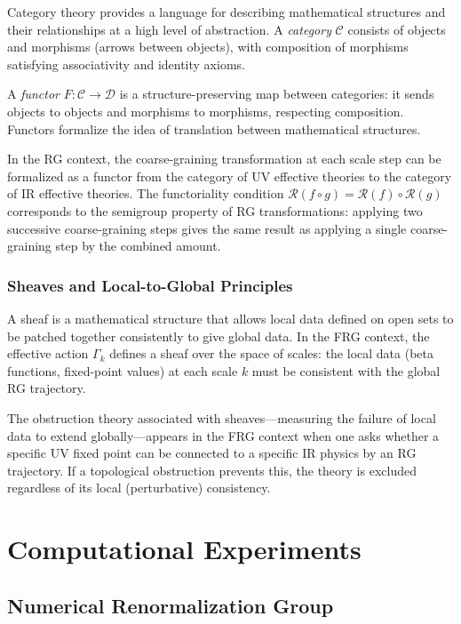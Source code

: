 \documentclass[12pt,a4paper,oneside]{book}
\theoremstyle{definition}
\theoremstyle{plain}
\theoremstyle{remark}
\begin{document}
Category theory provides a language for describing mathematical structures
and their relationships at a high level of abstraction. A \emph{category}
$\mathcal{C}$ consists of objects and morphisms (arrows between objects),
with composition of morphisms satisfying associativity and identity axioms.

A \emph{functor} $F: \mathcal{C} \to \mathcal{D}$ is a structure-preserving
map between categories: it sends objects to objects and morphisms to morphisms,
respecting composition. Functors formalize the idea of translation between
mathematical structures.

In the RG context, the coarse-graining transformation at each scale step
can be formalized as a functor from the category of UV effective theories
to the category of IR effective theories. The functoriality condition
$\mathcal{R}(f \circ g) = \mathcal{R}(f) \circ \mathcal{R}(g)$ corresponds
to the semigroup property of RG transformations: applying two successive
coarse-graining steps gives the same result as applying a single coarse-graining
step by the combined amount.

\section{Sheaves and Local-to-Global Principles}

A sheaf is a mathematical structure that allows local data defined on open
sets to be patched together consistently to give global data. In the FRG
context, the effective action $\Gamma_k$ defines a sheaf over the space of
scales: the local data (beta functions, fixed-point values) at each scale $k$
must be consistent with the global RG trajectory.

The obstruction theory associated with sheaves---measuring the failure of
local data to extend globally---appears in the FRG context when one asks
whether a specific UV fixed point can be connected to a specific IR physics
by an RG trajectory. If a topological obstruction prevents this, the theory
is excluded regardless of its local (perturbative) consistency.

\part{Computational Experiments}

\chapter{Numerical Renormalization Group}
\end{document}
